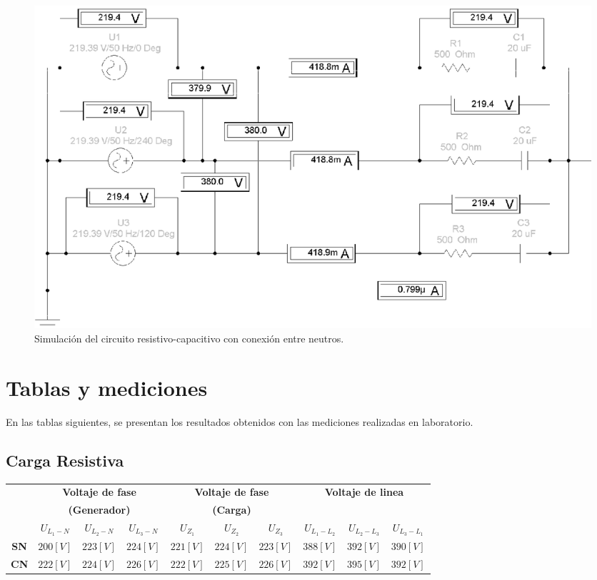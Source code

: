 \documentclass[letter,11pt]{article}
\begin{document}
\begin{figure}[!h]
\centering
\includegraphics[scale=0.88]{simulacion/practica1.6.eps}
\caption{Simulación del circuito resistivo-capacitivo con conexión entre neutros.}
\label{simulacion6}
\end{figure}

\section{Tablas y mediciones}
En las tablas siguientes, se presentan los resultados obtenidos con las
mediciones realizadas en laboratorio.

\subsection{Carga Resistiva}

\begin{center}
    \begin{tabular}{|c||c|c|c||c|c|c||c|c|c|}
    \hline
    & \multicolumn{3}{c||}{\textbf{Voltaje de fase}} & \multicolumn{3}{c||}{\textbf{Voltaje de fase}} & \multicolumn{3}{c|}{\textbf{Voltaje de linea}}
    \tabularnewline
    & \multicolumn{3}{c||}{\textbf{(Generador)}} & \multicolumn{3}{c||}{\textbf{(Carga)}} & \multicolumn{3}{c|}{}
    \tabularnewline \hline
    & $U_{L_1-N}$ & $U_{L_2-N}$ & $U_{L_3-N}$ & $U_{Z_1}$ & $U_{Z_2}$ & $U_{Z_3}$ & $U_{L_1-L_2}$ & $U_{L_2-L_3}$ & $U_{L_3-L_1}$
    \tabularnewline \hline \hline
    \textbf{SN} & $200[V]$ & $223[V]$ & $224[V]$ & $221[V]$ & $224[V]$ & $223[V]$ & $388[V]$ & $392[V]$ & $390[V]$
    \tabularnewline \hline
    \textbf{CN} & $222[V]$ & $224[V]$ & $226[V]$ & $222[V]$ & $225[V]$ & $226[V]$ & $392[V]$ & $395[V]$ & $392[V]$
    \tabularnewline \hline
    \end{tabular}
\end{center}
\end{document}
